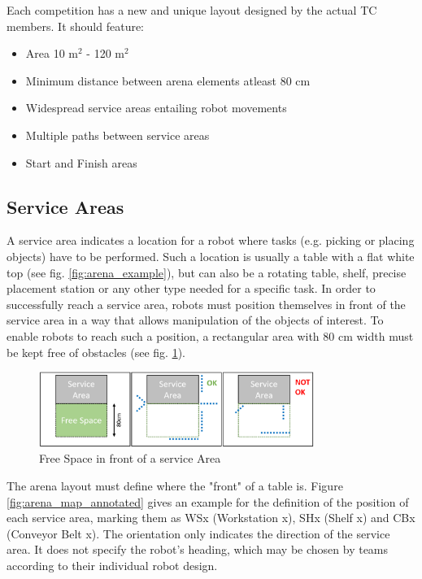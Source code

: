 Each competition has a new and unique layout designed by the actual TC members.
It should feature:
\begin{itemize}
\item Area 10 m$^2$ - 120 m$^2$
\item Minimum distance between arena elements atleast 80 cm 
\item Widespread service areas entailing robot movements
\item Multiple paths between service areas
\item Start and Finish areas
\end{itemize}


\subsection{Service Areas} 
\label{subsec: serviceareas}

A service area indicates a location for a robot where tasks (e.g. picking or placing objects) have to be performed.
Such a location is usually a table with a flat white top (see fig. \ref{fig:arena_example}), but can also be a rotating table, shelf, precise placement station or any other type needed for a specific task.
In order to successfully reach a service area, robots must position themselves in front of the service area in a way that allows manipulation of the objects of interest. To enable robots to reach such a position, a rectangular area with 80 cm width must be kept free of obstacles (see fig. \ref{fig:arena_service_area_free}). 

\begin{figure} [h!]
\centering
\includegraphics[width= 0.8\textwidth ]{./images/general_rules/arena_service_area_free_space}
\caption{Free Space in front of a service Area}
\label{fig:arena_service_area_free}
\end{figure}

The arena layout must define where the "front" of a table is.
Figure \ref{fig:arena_map_annotated} gives an example for the definition of the position of each service area, marking them as WSx (Workstation x), SHx (Shelf x) and CBx (Conveyor Belt x). The orientation only indicates the direction of the service area. It does not specify the robot's heading, which may be chosen by teams according to their individual robot design.

